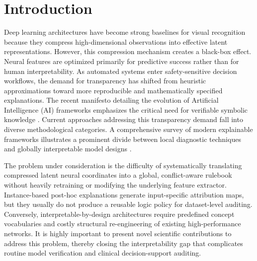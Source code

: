\documentclass[make,article,submit,pdftex,moreauthors]{Definitions/mdpi}
\begin{document}
\section{Introduction}
\label{sec:introduction}

Deep learning architectures have become strong baselines for visual recognition because they compress high-dimensional observations into effective latent representations. However, this compression mechanism creates a black-box effect. Neural features are optimized primarily for predictive success rather than for human interpretability. As automated systems enter safety-sensitive decision workflows, the demand for transparency has shifted from heuristic approximations toward more reproducible and mathematically specified explanations. The recent manifesto detailing the evolution of Artificial Intelligence (AI) frameworks emphasizes the critical need for verifiable symbolic knowledge \cite{Longo2024XAI}. Current approaches addressing this transparency demand fall into diverse methodological categories. A comprehensive survey of modern explainable frameworks illustrates a prominent divide between local diagnostic techniques and globally interpretable model designs \cite{Mersha2024XAISurvey}.

The problem under consideration is the difficulty of systematically translating compressed latent neural coordinates into a global, conflict-aware rulebook without heavily retraining or modifying the underlying feature extractor. Instance-based post-hoc explanations generate input-specific attribution maps, but they usually do not produce a reusable logic policy for dataset-level auditing. Conversely, interpretable-by-design architectures require predefined concept vocabularies and costly structural re-engineering of existing high-performance networks. It is highly important to present novel scientific contributions to address this problem, thereby closing the interpretability gap that complicates routine model verification and clinical decision-support auditing.
\end{document}
